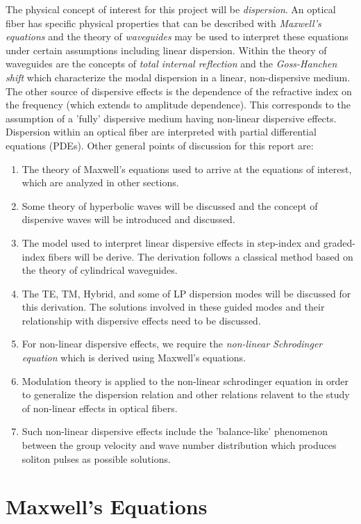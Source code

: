 \documentclass[12pt]{article}
\theoremstyle{definition}
\numberwithin{equation}{section}
\begin{document}
The physical concept of interest for this project will be {\it dispersion}. An optical fiber has specific physical properties that can be described with {\it Maxwell's equations} and the theory of {\it waveguides} may be used to interpret these equations under certain assumptions including linear dispersion. Within the theory of waveguides are the concepts of {\it total internal reflection} and the {\it Goss-Hanchen shift} which characterize the modal dispersion in a linear, non-dispersive medium. The other source of dispersive effects is the dependence of the refractive index on the frequency (which extends to amplitude dependence). This corresponds to the assumption of a 'fully' dispersive medium having non-linear dispersive effects. Dispersion within an optical fiber are interpreted with partial differential equations (PDEs). Other general points of discussion for this report are:
\begin{enumerate}
\item The theory of Maxwell's equations used to arrive at the equations of interest, which are analyzed in other sections.
\item Some theory of hyperbolic waves will be discussed and the concept of dispersive waves will be introduced and discussed.
\item The model used to interpret linear dispersive effects in step-index and graded-index fibers will be derive. The derivation follows a classical method based on the theory of cylindrical waveguides. 
\item The TE, TM, Hybrid, and some of LP dispersion modes will be discussed for this derivation. The solutions involved in these guided modes and their relationship with dispersive effects need to be discussed. 
\item For non-linear dispersive effects, we require the {\it non-linear Schrodinger equation} which is derived using Maxwell's equations. 
\item Modulation theory is applied to the non-linear schrodinger equation in order to generalize the dispersion relation and other relations relavent to the study of non-linear effects in optical fibers. 
\item Such non-linear dispersive effects include the 'balance-like' phenomenon between the group velocity and wave number distribution which produces soliton pulses as possible solutions.
\end{enumerate}


\section{Maxwell's Equations}
\end{document}
